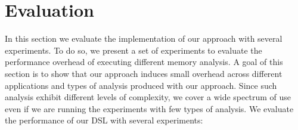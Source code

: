 \section{Evaluation}\label{sec:evaluation}
In this section we evaluate the implementation of our approach with several experiments.
To do so, we present a set of experiments to evaluate the performance overhead of executing different memory analysis.
A goal of this section is to show that our approach induces small overhead across different applications and types of analysis produced with our approach. Since such analysis exhibit different levels of complexity, we cover a wide spectrum of use even if we are running the experiments with few types of analysis.
We evaluate the performance of our DSL with several experiments:
